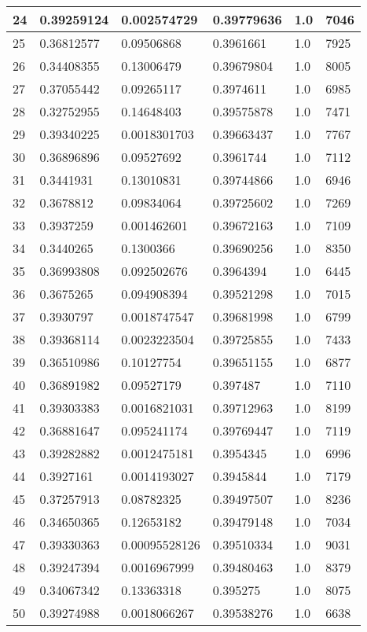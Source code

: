 \begin{longtable}{|l|l|l|l|l|l|}
24 & 0.39259124 & 0.002574729 & 0.39779636 & 1.0 & 7046 \\ \hline 
25 & 0.36812577 & 0.09506868 & 0.3961661 & 1.0 & 7925 \\ \hline 
26 & 0.34408355 & 0.13006479 & 0.39679804 & 1.0 & 8005 \\ \hline 
27 & 0.37055442 & 0.09265117 & 0.3974611 & 1.0 & 6985 \\ \hline 
28 & 0.32752955 & 0.14648403 & 0.39575878 & 1.0 & 7471 \\ \hline 
29 & 0.39340225 & 0.0018301703 & 0.39663437 & 1.0 & 7767 \\ \hline 
30 & 0.36896896 & 0.09527692 & 0.3961744 & 1.0 & 7112 \\ \hline 
31 & 0.3441931 & 0.13010831 & 0.39744866 & 1.0 & 6946 \\ \hline 
32 & 0.3678812 & 0.09834064 & 0.39725602 & 1.0 & 7269 \\ \hline 
33 & 0.3937259 & 0.001462601 & 0.39672163 & 1.0 & 7109 \\ \hline 
34 & 0.3440265 & 0.1300366 & 0.39690256 & 1.0 & 8350 \\ \hline 
35 & 0.36993808 & 0.092502676 & 0.3964394 & 1.0 & 6445 \\ \hline 
36 & 0.3675265 & 0.094908394 & 0.39521298 & 1.0 & 7015 \\ \hline 
37 & 0.3930797 & 0.0018747547 & 0.39681998 & 1.0 & 6799 \\ \hline 
38 & 0.39368114 & 0.0023223504 & 0.39725855 & 1.0 & 7433 \\ \hline 
39 & 0.36510986 & 0.10127754 & 0.39651155 & 1.0 & 6877 \\ \hline 
40 & 0.36891982 & 0.09527179 & 0.397487 & 1.0 & 7110 \\ \hline 
41 & 0.39303383 & 0.0016821031 & 0.39712963 & 1.0 & 8199 \\ \hline 
42 & 0.36881647 & 0.095241174 & 0.39769447 & 1.0 & 7119 \\ \hline 
43 & 0.39282882 & 0.0012475181 & 0.3954345 & 1.0 & 6996 \\ \hline 
44 & 0.3927161 & 0.0014193027 & 0.3945844 & 1.0 & 7179 \\ \hline 
45 & 0.37257913 & 0.08782325 & 0.39497507 & 1.0 & 8236 \\ \hline 
46 & 0.34650365 & 0.12653182 & 0.39479148 & 1.0 & 7034 \\ \hline 
47 & 0.39330363 & 0.00095528126 & 0.39510334 & 1.0 & 9031 \\ \hline 
48 & 0.39247394 & 0.0016967999 & 0.39480463 & 1.0 & 8379 \\ \hline 
49 & 0.34067342 & 0.13363318 & 0.395275 & 1.0 & 8075 \\ \hline 
50 & 0.39274988 & 0.0018066267 & 0.39538276 & 1.0 & 6638 \\ \hline 
\end{longtable}